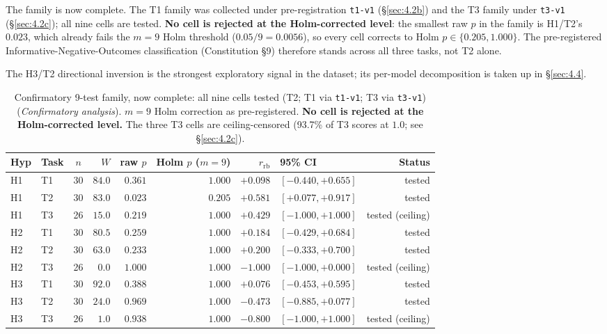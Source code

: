 \documentclass[11pt]{article}
\begin{document}
The family is now complete. The T1 family was collected under
pre-registration \texttt{t1-v1} (\S\ref{sec:4.2b}) and the T3 family
under \texttt{t3-v1} (\S\ref{sec:4.2c}); all nine cells are tested.
\textbf{No cell is rejected at the Holm-corrected level}: the smallest raw
$p$ in the family is H1/T2's $0.023$, which already fails the $m=9$ Holm
threshold ($0.05/9 = 0.0056$), so every cell corrects to Holm
$p \in \{0.205, 1.000\}$. The pre-registered Informative-Negative-Outcomes
classification (Constitution \S9) therefore stands across all three tasks,
not T2 alone.

The H3/T2 directional inversion is the strongest exploratory signal
in the dataset; its per-model decomposition is taken up in
\S\ref{sec:4.4}.

\begin{table}[h]
\centering
\footnotesize
\caption{Confirmatory 9-test family, now complete: all nine cells tested
(T2; T1 via \texttt{t1-v1}; T3 via \texttt{t3-v1}) (\emph{Confirmatory
analysis}). $m=9$ Holm correction as pre-registered. \textbf{No cell is rejected
at the Holm-corrected level.} The three T3 cells are ceiling-censored (93.7\% of
T3 scores at $1.0$; see \S\ref{sec:4.2c}).}
\label{tab:confirmatory-family}
\begin{tabular}{llcrrrrlr}
\toprule
Hyp & Task & $n$ & $W$ & raw $p$ & Holm $p$ ($m=9$) & $r_{\text{rb}}$ & 95\% CI & Status \\
\midrule
H1 & T1 & 30  & $84.0$ & $0.361$ & $1.000$ & $+0.098$  & $[-0.440, +0.655]$   & tested \\
H1 & T2 & 30  & $83.0$ & $0.023$ & $0.205$ & $+0.581$  & $[+0.077, +0.917]$   & tested \\
H1 & T3 & 26  & $15.0$ & $0.219$ & $1.000$ & $+0.429$  & $[-1.000, +1.000]$   & tested (ceiling) \\
H2 & T1 & 30  & $80.5$ & $0.259$ & $1.000$ & $+0.184$  & $[-0.429, +0.684]$   & tested \\
H2 & T2 & 30  & $63.0$ & $0.233$ & $1.000$ & $+0.200$  & $[-0.333, +0.700]$   & tested \\
H2 & T3 & 26  & $0.0$  & $1.000$ & $1.000$ & $-1.000$  & $[-1.000, +0.000]$   & tested (ceiling) \\
H3 & T1 & 30  & $92.0$ & $0.388$ & $1.000$ & $+0.076$  & $[-0.453, +0.595]$   & tested \\
H3 & T2 & 30  & $24.0$ & $0.969$ & $1.000$ & $-0.473$  & $[-0.885, +0.077]$   & tested \\
H3 & T3 & 26  & $1.0$  & $0.938$ & $1.000$ & $-0.800$  & $[-1.000, +1.000]$   & tested (ceiling) \\
\bottomrule
\end{tabular}
\end{table}
\end{document}
